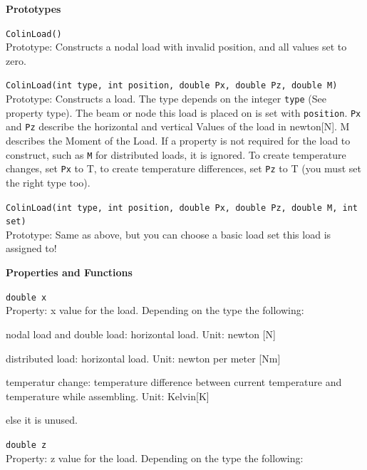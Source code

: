\begin{trivlist}
\begin{trivlist}
	\item[]\textbf{Prototypes}
	\begin{trivlist}
		\leftskip=1cm
		\item[] \texttt{ColinLoad()}\\Prototype: Constructs a nodal load with invalid position, and all values set to zero.
		\item[] \texttt{ColinLoad(int type, int position, double Px, double Pz, double M)}\\ Prototype: Constructs a load. The type depends on the integer \texttt{type} (See property type). The beam or node this load is placed on is set with \texttt{position}. \texttt{Px} and \texttt{Pz} describe the horizontal and vertical Values of the load in newton[N]. M describes the Moment of the Load. If a property is not required for the load to construct, such as \texttt{M} for distributed loads, it is ignored. To create temperature changes, set \texttt{Px} to T, to create temperature differences, set \texttt{Pz} to T (you must set the right type too).
		\item[] \texttt{ColinLoad(int type, int position, double Px, double Pz, double M, int set)}\\Prototype: Same as above, but you can choose a basic load set this load is assigned to!
	\end{trivlist}
	\item[]\textbf{Properties and Functions}
	\begin{trivlist}
		\leftskip=1cm
		\item[]\texttt{double x}\\Property: x value for the load. Depending on the type the following:
		\begin{trivlist}
			\leftskip=2cm
			\item[] nodal load and double load: horizontal load. Unit: newton [N]
			\item[] distributed load: horizontal load. Unit: newton per meter [Nm]
			\item[] temperatur change: temperature difference between current temperature and temperature while assembling. Unit: Kelvin[K]
			\item[] else it is unused.
		\end{trivlist}
		\item[]\texttt{double z}\\Property: z value for the load. Depending on the type the following:
		\begin{trivlist}

\end{trivlist}
\end{trivlist}
\end{trivlist}
\end{trivlist}
